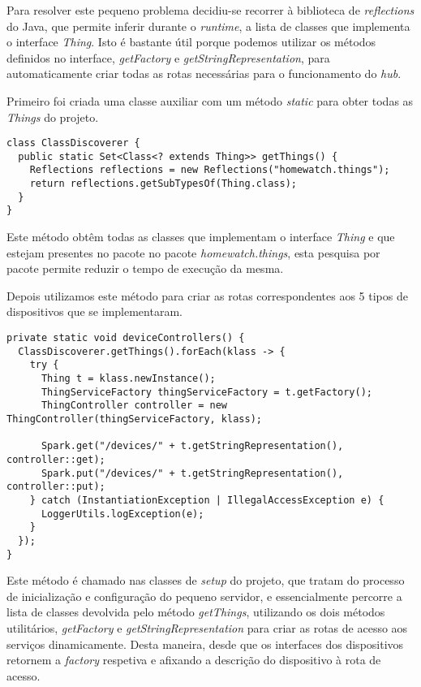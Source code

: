 Para resolver este pequeno problema decidiu-se recorrer à biblioteca de \textit{reflections} do Java, que permite inferir durante o \textit{runtime}, a lista de classes que implementa o interface \textit{Thing}. Isto é bastante útil porque podemos utilizar os métodos definidos no interface, \textit{getFactory} e \textit{getStringRepresentation}, para automaticamente criar todas as rotas necessárias para o funcionamento do \textit{hub}.

Primeiro foi criada uma classe auxiliar com um método \textit{static} para obter todas as \textit{Things} do projeto.

\begin{verbatim}
class ClassDiscoverer {
  public static Set<Class<? extends Thing>> getThings() {
    Reflections reflections = new Reflections("homewatch.things");
    return reflections.getSubTypesOf(Thing.class);
  }
}
\end{verbatim}

Este método obtêm todas as classes que implementam o interface \textit{Thing} e que estejam presentes no pacote no pacote \textit{homewatch.things}, esta pesquisa por pacote permite reduzir o tempo de execução da mesma.

Depois utilizamos este método para criar as rotas correspondentes aos 5 tipos de dispositivos que se implementaram.

\begin{verbatim}
private static void deviceControllers() {
  ClassDiscoverer.getThings().forEach(klass -> {
    try {
      Thing t = klass.newInstance();
      ThingServiceFactory thingServiceFactory = t.getFactory();
      ThingController controller = new ThingController(thingServiceFactory, klass);

      Spark.get("/devices/" + t.getStringRepresentation(), controller::get);
      Spark.put("/devices/" + t.getStringRepresentation(), controller::put);
    } catch (InstantiationException | IllegalAccessException e) {
      LoggerUtils.logException(e);
    }
  });
}
\end{verbatim}

Este método é chamado nas classes de \textit{setup} do projeto, que tratam do processo de inicialização e configuração do pequeno servidor, e essencialmente percorre a lista de classes devolvida pelo método \textit{getThings}, utilizando os dois métodos utilitários, \textit{getFactory} e \textit{getStringRepresentation} para criar as rotas de acesso aos serviços dinamicamente. Desta maneira, desde que os interfaces dos dispositivos retornem a \textit{factory} respetiva e afixando a descrição do dispositivo à rota de acesso.

